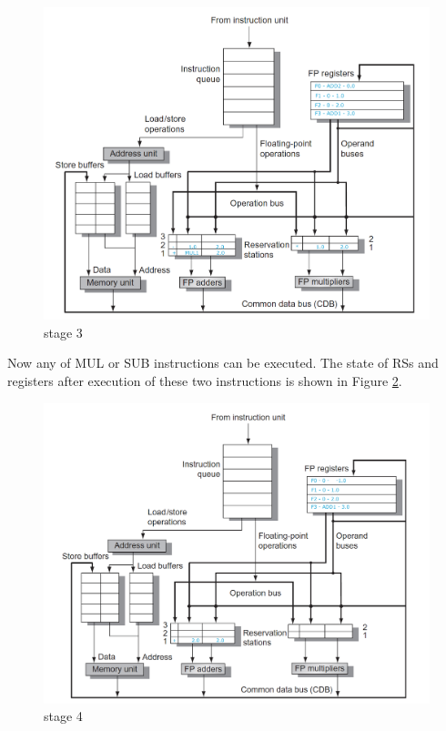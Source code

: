 \documentclass[12pt]{article}
\begin{document}
\begin{figure}[H]
	\centering
	\includegraphics[width=1\textwidth]{./images/tomas/e3.png}	
	\cprotect\caption{stage 3}
	\label{fig:tom4}
\end{figure}


Now any of MUL or SUB instructions can be executed. The state of RSs and registers after execution of these two instructions is shown in Figure \ref{fig:tom5}. 

\begin{figure}[H]
	\centering
	\includegraphics[width=1\textwidth]{./images/tomas/e4.png}	
	\cprotect\caption{stage 4}
	\label{fig:tom5}
\end{figure}
\end{document}
